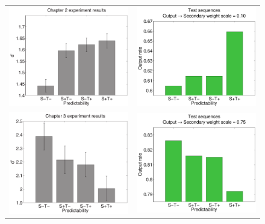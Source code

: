 \documentclass[dwyatte_dissertation.tex]{subfiles}
\begin{document}
\begin{figure}[h!]
\begin{center}
\begin{tabular}{ll}
\includegraphics[width=80mm]{figs/chap_sims/pleast_dprime.pdf} &
\includegraphics[width=80mm]{figs/chap_sims/sims_out_v2h_10_sterr.pdf} \\
\includegraphics[width=80mm]{figs/chap_sims/bpleast_dprime.pdf} &
\includegraphics[width=80mm]{figs/chap_sims/sims_out_v2h_75_sterr.pdf} \\

\end{tabular}
\end{center}
\end{figure}
\end{document}
